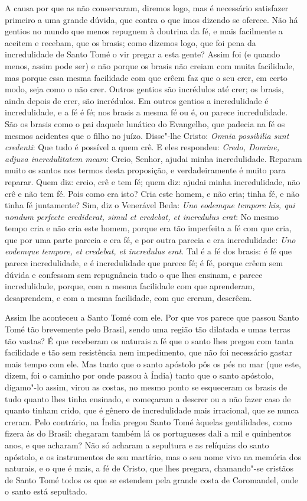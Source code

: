 A causa por que as não conservaram, diremos logo, mas é necessário
satisfazer primeiro a uma grande dúvida, que contra o que imos dizendo
se oferece. Não há gentios no mundo que menos repugnem à doutrina da fé,
e mais facilmente a aceitem e recebam, que os brasis; como dizemos logo,
que foi pena da incredulidade de Santo Tomé o vir pregar a esta gente?
Assim foi (e quando menos, assim pode ser) e não porque os brasis
não creiam com muita facilidade, mas porque essa mesma facilidade com
que crêem faz que o seu crer, em certo modo, seja como o não crer.
Outros gentios são incrédulos até crer; os brasis, ainda depois de crer,
são incrédulos. Em outros gentios a incredulidade é incredulidade, e a
fé é fé; nos brasis a mesma fé ou é, ou parece incredulidade. São os
brasis como o pai daquele lunático do Evangelho, que padecia na fé os
mesmos acidentes que o filho no juízo. Disse"-lhe Cristo: \emph{Omnia
possibilia sunt credenti}: Que tudo é possível a quem crê.
E eles respondeu: \emph{Credo, Domine, adjuva incredulitatem meam}:
Creio, Senhor, ajudai minha incredulidade.
Reparam muito os santos nos termos desta proposição, e
verdadeiramente é muito para reparar. Quem diz: creio, crê e tem fé;
quem diz: ajudai minha incredulidade, não crê e não tem fé. Pois como
era isto? Cria este homem, e não cria; tinha fé, e não tinha fé
juntamente? Sim, diz o Venerável Beda: \emph{Uno eodemque tempore his,
qui nondum perfecte crediderat, simul et credebat, et incredulus erat}:
No mesmo tempo cria e não cria este homem, porque era tão imperfeita a
fé com que cria, que por uma parte parecia e era fé, e por outra parecia
e era incredulidade: \emph{Uno eodemque tempore, et credebat, et
incredulus erat}. Tal é a fé dos brasis: é fé que parece incredulidade,
e é incredulidade que parece fé; é fé, porque crêem sem dúvida e
confessam sem repugnância tudo o que lhes ensinam, e parece
incredulidade, porque, com a mesma facilidade com que aprenderam,
desaprendem, e com a mesma facilidade, com que creram, descrêem.


Assim lhe aconteceu a Santo Tomé com ele. Por que vos parece que passou
Santo Tomé tão brevemente pelo Brasil, sendo uma região tão dilatada e
umas terras tão vastas? É que receberam os naturais a fé que o santo lhes
pregou com tanta facilidade e tão sem resistência nem impedimento, que
não foi necessário gastar mais tempo com ele. Mas tanto que o santo
apóstolo pôs os pés no mar (que este, dizem, foi o caminho por onde
passou à Índia) tanto que o santo apóstolo, digamo"-lo assim,
virou as costas, no mesmo ponto se esqueceram os brasis de tudo quanto
lhes tinha ensinado, e começaram a descrer ou a não fazer caso de quanto
tinham crido, que é gênero de incredulidade mais irracional, que se
nunca creram. Pelo contrário, na Índia pregou Santo Tomé àquelas
gentilidades, como fizera às do Brasil: chegaram também lá os
portugueses dali a mil e quinhentos anos, e que acharam? Não só acharam
a sepultura e as relíquias do santo apóstolo, e os instrumentos de seu
martírio, mas o seu nome vivo na memória dos naturais, e o que é mais, a
fé de Cristo, que lhes pregara, chamando"-se cristãos de Santo Tomé todos
os que se estendem pela grande costa de Coromandel, onde o santo está
sepultado.

